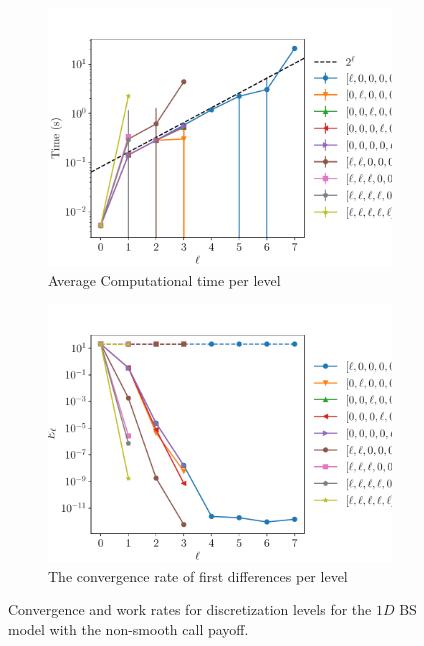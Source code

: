 \documentclass[11pt]{article}
\begin{document}
\begin{figure}[h!]
	\centering
	\begin{subfigure}{.5\textwidth}
		\centering
		\includegraphics[width=0.95\linewidth]{./figures/1D_BS_16_steps_non_smooth/level_work.pdf}
		\caption{Average Computational time per level}
		\label{fig:misc_1D_BS_non_smooth_16steps_sub3}
	\end{subfigure}%
	\begin{subfigure}{.5\textwidth}
		\centering
		\includegraphics[width=0.95\linewidth]{./figures/1D_BS_16_steps_non_smooth/levels_error_rate.pdf}
		\caption{ The convergence rate of first differences per level}
		\label{fig:misc_1D_BS_non_smooth_16steps_sub4}
	\end{subfigure}%
	\caption{Convergence and work rates for discretization levels for the $1D$ BS model with the non-smooth call payoff.}
	\label{fig:misc_1D_BS_16teps_2}
\end{figure}
\end{document}
